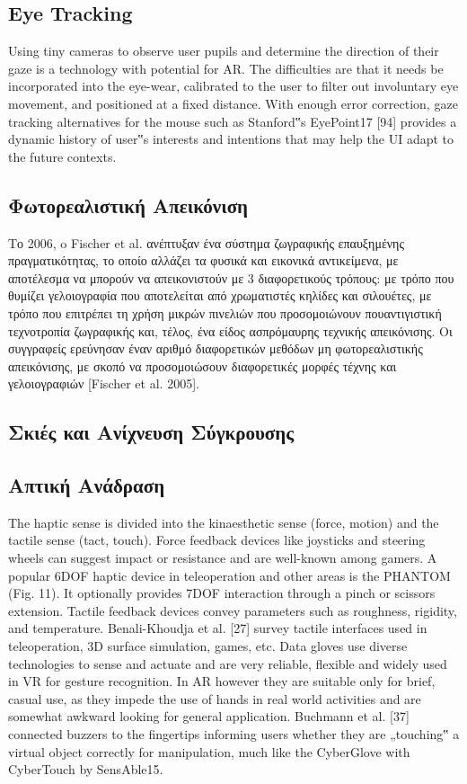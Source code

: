 \subsection{Eye Tracking}
Using tiny cameras to observe user pupils and determine
the direction of their gaze is a technology with potential for
AR. The difficulties are that it needs be incorporated into the
eye-wear, calibrated to the user to filter out involuntary eye
movement, and positioned at a fixed distance. With enough
error correction, gaze tracking alternatives for the mouse
such as Stanford‟s EyePoint17 [94] provides a dynamic history
of user‟s interests and intentions that may help the UI
adapt to the future contexts.
\subsection{Φωτορεαλιστική Απεικόνιση}

Το 2006, o Fischer et al. ανέπτυξαν ένα σύστημα ζωγραφικής επαυξημένης πραγματικότητας, το οποίο αλλάζει τα φυσικά και εικονικά αντικείμενα, με αποτέλεσμα να μπορούν να απεικονιστούν με 3 διαφορετικούς τρόπους: με τρόπο που θυμίζει γελοιογραφία που αποτελείται από χρωματιστές κηλίδες και σιλουέτες, με τρόπο που επιτρέπει τη χρήση μικρών πινελιών που προσομοιώνουν πουαντιγιστική τεχνοτροπία ζωγραφικής και, τέλος, ένα είδος ασπρόμαυρης τεχνικής απεικόνισης. Οι συγγραφείς ερεύνησαν έναν αριθμό διαφορετικών μεθόδων μη φωτορεαλιστικής απεικόνισης, με σκοπό να προσομοιώσουν διαφορετικές μορφές τέχνης και γελοιογραφιών [Fischer et al. 2005].


\subsection{Σκιές και Ανίχνευση Σύγκρουσης }


\subsection{Απτική Ανάδραση }

The haptic sense is divided into the kinaesthetic sense
(force, motion) and the tactile sense (tact, touch). Force
feedback devices like joysticks and steering wheels can
suggest impact or resistance and are well-known among
gamers. A popular 6DOF haptic device in teleoperation and
other areas is the PHANTOM (Fig. 11). It optionally provides
7DOF interaction through a pinch or scissors extension.
Tactile feedback devices convey parameters such as roughness,
rigidity, and temperature. Benali-Khoudja et al. [27]
survey tactile interfaces used in teleoperation, 3D surface
simulation, games, etc.
Data gloves use diverse technologies to sense and actuate
and are very reliable, flexible and widely used in VR for
gesture recognition. In AR however they are suitable only for
brief, casual use, as they impede the use of hands in real
world activities and are somewhat awkward looking for
general application. Buchmann et al. [37] connected buzzers
to the fingertips informing users whether they are „touching‟
a virtual object correctly for manipulation, much like the
CyberGlove with CyberTouch by SensAble15.

